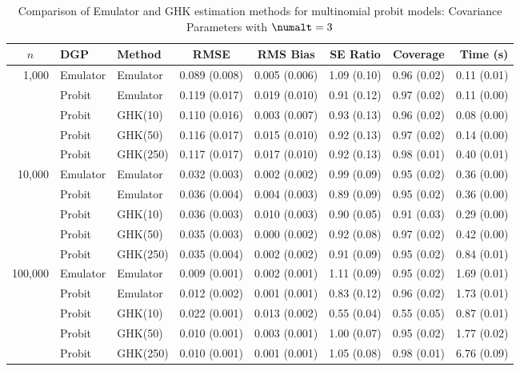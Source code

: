 \begin{table}[htbp]
\centering
\footnotesize
\begin{tabular}{@{}rllrrrrr@{}}
\toprule
\multicolumn{1}{c}{$n$} & \multicolumn{1}{l}{DGP} & \multicolumn{1}{l}{Method} & \multicolumn{1}{c}{RMSE} & \multicolumn{1}{c}{RMS Bias} & \multicolumn{1}{c}{SE Ratio} & \multicolumn{1}{c}{Coverage} & \multicolumn{1}{r}{Time (s)} \\
\midrule
\multirow{5}{*}{1,000} & Emulator & Emulator & 0.089 (0.008) & 0.005 (0.006) & 1.09 (0.10) & 0.96 (0.02) & 0.11 (0.01) \\
 & Probit & Emulator & 0.119 (0.017) & 0.019 (0.010) & 0.91 (0.12) & 0.97 (0.02) & 0.11 (0.00) \\
 & Probit & GHK(10) & 0.110 (0.016) & 0.003 (0.007) & 0.93 (0.13) & 0.96 (0.02) & 0.08 (0.00) \\
 & Probit & GHK(50) & 0.116 (0.017) & 0.015 (0.010) & 0.92 (0.13) & 0.97 (0.02) & 0.14 (0.00) \\
 & Probit & GHK(250) & 0.117 (0.017) & 0.017 (0.010) & 0.92 (0.13) & 0.98 (0.01) & 0.40 (0.01) \\
\midrule
\multirow{5}{*}{10,000} & Emulator & Emulator & 0.032 (0.003) & 0.002 (0.002) & 0.99 (0.09) & 0.95 (0.02) & 0.36 (0.00) \\
 & Probit & Emulator & 0.036 (0.004) & 0.004 (0.003) & 0.89 (0.09) & 0.95 (0.02) & 0.36 (0.00) \\
 & Probit & GHK(10) & 0.036 (0.003) & 0.010 (0.003) & 0.90 (0.05) & 0.91 (0.03) & 0.29 (0.00) \\
 & Probit & GHK(50) & 0.035 (0.003) & 0.000 (0.002) & 0.92 (0.08) & 0.97 (0.02) & 0.42 (0.00) \\
 & Probit & GHK(250) & 0.035 (0.004) & 0.002 (0.002) & 0.91 (0.09) & 0.95 (0.02) & 0.84 (0.01) \\
\midrule
\multirow{5}{*}{100,000} & Emulator & Emulator & 0.009 (0.001) & 0.002 (0.001) & 1.11 (0.09) & 0.95 (0.02) & 1.69 (0.01) \\
 & Probit & Emulator & 0.012 (0.002) & 0.001 (0.001) & 0.83 (0.12) & 0.96 (0.02) & 1.73 (0.01) \\
 & Probit & GHK(10) & 0.022 (0.001) & 0.013 (0.002) & 0.55 (0.04) & 0.55 (0.05) & 0.87 (0.01) \\
 & Probit & GHK(50) & 0.010 (0.001) & 0.003 (0.001) & 1.00 (0.07) & 0.95 (0.02) & 1.77 (0.02) \\
 & Probit & GHK(250) & 0.010 (0.001) & 0.001 (0.001) & 1.05 (0.08) & 0.98 (0.01) & 6.76 (0.09) \\
\bottomrule
\end{tabular}
\caption{Comparison of Emulator and GHK estimation methods for multinomial probit models: Covariance Parameters with $\numalt=3$}
\label{tab:emulator_vs_ghk:3:covariance}
\end{table}